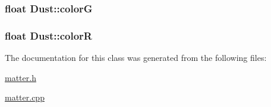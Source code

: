 \subsubsection[{color\+G}]{\setlength{\rightskip}{0pt plus 5cm}float Dust\+::color\+G\hspace{0.3cm}{\ttfamily [private]}}\label{classDust_a97d9fa2655101d2ea41c1a6a5f89bd32}
\hypertarget{classDust_a38fced9e145e03d4bb548924bd99a7fd}{}
\subsubsection[{color\+R}]{\setlength{\rightskip}{0pt plus 5cm}float Dust\+::color\+R\hspace{0.3cm}{\ttfamily [private]}}\label{classDust_a38fced9e145e03d4bb548924bd99a7fd}


The documentation for this class was generated from the following files\+:\begin{DoxyCompactItemize}
\item 
\hyperlink{matter_8h}{matter.\+h}\item 
\hyperlink{matter_8cpp}{matter.\+cpp}\end{DoxyCompactItemize}
